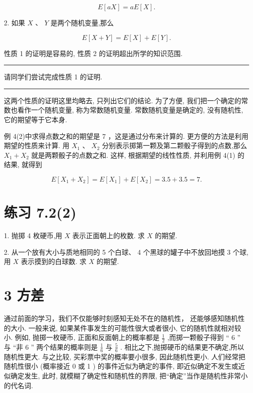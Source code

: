 \documentclass[10pt]{article}
\newcommand{\HRule}{\begin{center}\rule{0.9\linewidth}{0.2mm}\end{center}}
\begin{document}
\[
E\left\lbrack  {aX}\right\rbrack   = {aE}\left\lbrack  X\right\rbrack  .
\]

2. 如果 \(X\text{ 、 }Y\) 是两个随机变量,那么

\[
E\left\lbrack  {X + Y}\right\rbrack   = E\left\lbrack  X\right\rbrack   + E\left\lbrack  Y\right\rbrack  .
\]

性质 1 的证明是容易的, 性质 2 的证明超出所学的知识范围.



\HRule

请同学们尝试完成性质 1 的证明.

\HRule

这两个性质的证明这里均略去, 只列出它们的结论. 为了方便, 我们把一个确定的常数也看作一个随机变量, 称为常数随机变量. 常数随机变量是确定的, 没有随机性, 它的期望等于它本身.

例 4(2)中求得点数之和的期望是 7 ，这是通过分布来计算的. 更方便的方法是利用期望的性质来计算. 用 \({X}_{1}\) 、 \({X}_{2}\) 分别表示掷第一颗及第二颗骰子得到的点数,那么 \({X}_{1} + {X}_{2}\) 就是两颗骰子的点数之和. 这样, 根据期望的线性性质, 并利用例 4(1) 的结果, 就得到

\[
E\left\lbrack  {{X}_{1} + {X}_{2}}\right\rbrack   = E\left\lbrack  {X}_{1}\right\rbrack   + E\left\lbrack  {X}_{2}\right\rbrack   = {3.5} + {3.5} = 7.
\]

\section*{练习 7.2(2)}

1. 抛掷 4 枚硬币,用 \(X\) 表示正面朝上的枚数. 求 \(X\) 的期望.

2. 从一个放有大小与质地相同的 5 个白球、 4 个黑球的罐子中不放回地摸 3 个球, 用 \(X\) 表示摸到的白球数. 求 \(X\) 的期望.

\section*{3 方差}

通过前面的学习，我们不仅能够时刻感知无处不在的随机性， 还能够感知随机性的大小. 一般来说, 如果某件事发生的可能性很大或者很小, 它的随机性就相对较小. 例如, 抛掷一枚硬币, 正面和反面朝上的概率都是 \(\frac{1}{2}\) ,而掷一颗骰子得到 “ 6 ” 与 “非 6 ” 两个结果的概率则是 \(\frac{1}{6}\) 与 \(\frac{5}{6}\) . 相比之下,抛掷硬币的结果更不确定,所以随机性更大. 与之比较, 买彩票中奖的概率要小很多, 因此随机性更小. 人们经常把随机性很小 (概率接近 0 或 1 ) 的事件近似为确定的事件, 即近似确定不发生或近似确定发生, 此时, 就模糊了确定性和随机性的界限, 把“确定”当作是随机性非常小的代名词.
\end{document}
